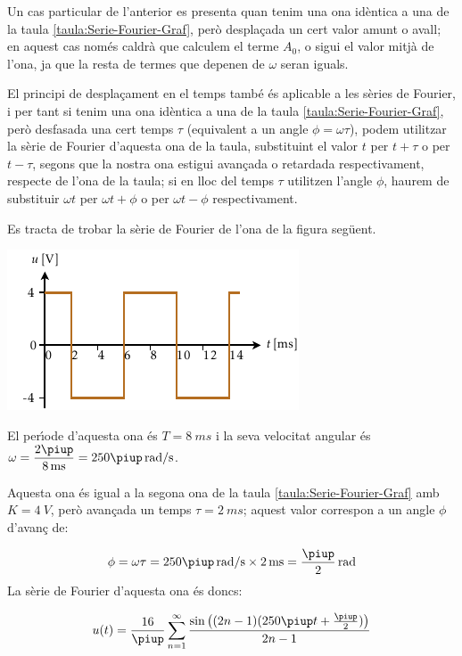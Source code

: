 Un cas particular de l'anterior es presenta quan tenim una ona  id\`{e}ntica a una de la taula \vref{taula:Serie-Fourier-Graf}, per\`{o} despla\c{c}ada un cert valor amunt o avall; en aquest cas nom\'{e}s caldr\`{a} que calculem el terme $A_0$, o sigui el valor mitj\`{a} de l'ona, ja que la resta de termes que depenen de $\omega$ seran iguals.

El principi de despla\c{c}ament en el temps tamb\'{e} \'{e}s aplicable a les s\`{e}ries de Fourier, i per tant si tenim una ona id\`{e}ntica a una de la taula \vref{taula:Serie-Fourier-Graf}, per\`{o} desfasada una cert temps $\tau$ (equivalent a un angle $\phi = \omega \tau$), podem utilitzar la s\`{e}rie de Fourier d'aquesta ona de la taula, substituint el valor $t$ per $t+\tau$ o per $t-\tau$, segons que la nostra ona estigui avan\c{c}ada o retardada respectivament, respecte de l'ona de la taula; si en lloc del temps $\tau$ utilitzen l'angle $\phi$, haurem de substituir  $\omega t$ per $\omega t + \phi$ o per $\omega t - \phi$ respectivament.


\begin{exemple}
    Es tracta de trobar la s\`{e}rie de Fourier de l'ona de la figura seg\"{u}ent.
    \begin{center}
        \includegraphics{Imatges/Cap-Fourier-Exemple-Taula.pdf}
    \end{center}

    El per\'{\i}ode d'aquesta ona \'{e}s $T=\SI{8}{ms}$ i la seva velocitat angular \'{e}s $\omega = \dfrac{2\piup}{\SI{8}{ms}} = 250 \piup\unit{rad/s}$.

    Aquesta ona \'{e}s igual a la segona ona de la taula \vref{taula:Serie-Fourier-Graf} amb $K=\SI{4}{V}$, per\`{o} avan\c{c}ada un temps $\tau=\SI{2}{ms}$; aquest valor correspon a un angle $\phi$ d'avan\c{c} de:

    \[
        \phi = \omega \tau = 250\piup\unit{rad/s} \times \SI{2}{ms} = \frac{\piup}{2}\unit{rad}
    \]
    La s\`{e}rie de Fourier d'aquesta ona \'{e}s doncs:

    \[
    u(t) = \frac{{16}}{\piup }\sum\limits_{n = 1}^\infty  {\frac{{\sin \big((2n - 1)(250\piup t+ \frac{\piup}{2})\big)}}{{2n - 1}}}
    \]
\end{exemple}

